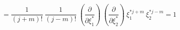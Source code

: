 \begin{equation}
~~= \frac{1}{(j+m)!}~ \frac{1}{(j-m)!}~ (\frac{\partial}{\partial \xi_1^*})~(\frac{\partial}{\partial \xi_2^*})~\xi_1^{* j+m}~\xi_2^{* j-m}=1
\end{equation}


